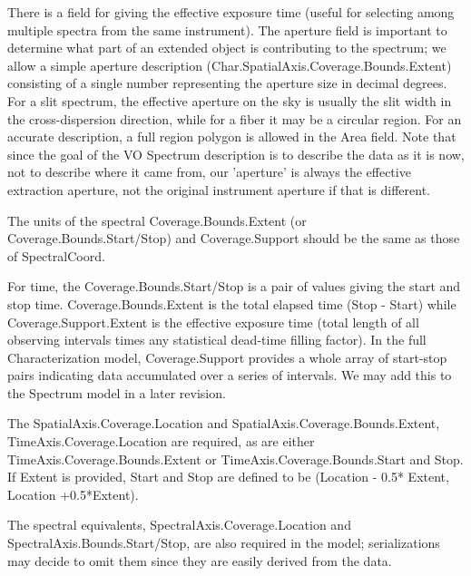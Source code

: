 \documentclass[11pt]{article}
\begin{document}
There is a field for giving the effective exposure time (useful 
for selecting among multiple spectra from the same instrument). 
The aperture field is 
important to determine what part of an extended object is contributing
to the spectrum; we allow a simple aperture description (Char.SpatialAxis.Coverage.Bounds.Extent)
consisting of a single number representing the aperture size in decimal degrees.
For a slit spectrum, the effective aperture on the sky is usually the slit width
in the cross-dispersion direction, while for a fiber it may be a circular
region. For an accurate description, a full region polygon is allowed in the Area field.
Note that since the goal of the VO Spectrum description is to describe
the data as it is now, not to describe where it came from, our 'aperture'
is always the effective extraction aperture, not the original instrument
aperture if that is different.


 
The units of the spectral Coverage.Bounds.Extent (or Coverage.Bounds.Start/Stop) 
and Coverage.Support should be the same as those of SpectralCoord.

    
For time, the Coverage.Bounds.Start/Stop is a pair of values giving the start and stop time.
Coverage.Bounds.Extent is the total elapsed time (Stop - Start) while Coverage.Support.Extent
is the effective exposure time (total length of all observing intervals times any statistical
dead-time
filling factor).
In the full Characterization model,
Coverage.Support provides a whole array of start-stop pairs indicating data
accumulated over a series of intervals. We may add this to the Spectrum model
in a later revision.

The SpatialAxis.Coverage.Location 
and  SpatialAxis.Coverage.Bounds.Extent, 
TimeAxis.Coverage.Location are required, as are
either  TimeAxis.Coverage.Bounds.Extent or TimeAxis.Coverage.Bounds.Start and Stop.
If Extent is provided, Start and Stop are defined to be (Location - 0.5* Extent,
Location +0.5*Extent).

The spectral equivalents, SpectralAxis.Coverage.Location and
SpectralAxis.Bounds.Start/Stop, are also required in the model;
serializations may decide to omit them since they  are easily derived from the data.

\end{document}
